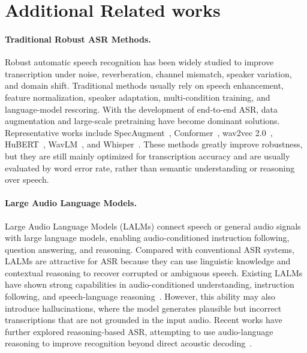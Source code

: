 \documentclass{llmxive}
\begin{document}

\section{Additional Related works}
\paragraph{Traditional Robust ASR Methods.}
Robust automatic speech recognition has been widely studied to improve transcription under noise, reverberation, channel mismatch, speaker variation, and domain shift. Traditional methods usually rely on speech enhancement, feature normalization, speaker adaptation, multi-condition training, and language-model rescoring. With the development of end-to-end ASR, data augmentation and large-scale pretraining have become dominant solutions. Representative works include SpecAugment~\cite{park2019specaugment}, Conformer~\cite{conformer}, wav2vec 2.0~\cite{wav2vec}, HuBERT~\cite{hubert}, WavLM~\cite{wavllm}, and Whisper~\cite{whisper}. These methods greatly improve robustness, but they are still mainly optimized for transcription accuracy and are usually evaluated by word error rate, rather than semantic understanding or reasoning over speech.

\paragraph{Large Audio Language Models.}
Large Audio Language Models (LALMs) connect speech or general audio signals with large language models, enabling audio-conditioned instruction following, question answering, and reasoning. Compared with conventional ASR systems, LALMs are attractive for ASR because they can use linguistic knowledge and contextual reasoning to recover corrupted or ambiguous speech. Existing LALMs have shown strong capabilities in audio-conditioned understanding, instruction following, and speech-language reasoning~\cite{LTU,pengi,qwen2.5omni,audiopalm,wavllm,audioflamingo,mini-omni,mini-omni2,stepaudio2,seedasr}. However, this ability may also introduce hallucinations, where the model generates plausible but incorrect transcriptions that are not grounded in the input audio. Recent works have further explored reasoning-based ASR, attempting to use audio-language reasoning to improve recognition beyond direct acoustic decoding~\cite{audio-reasoner,mini-omni-reasoner,huang2025rebellion}.
\end{document}
